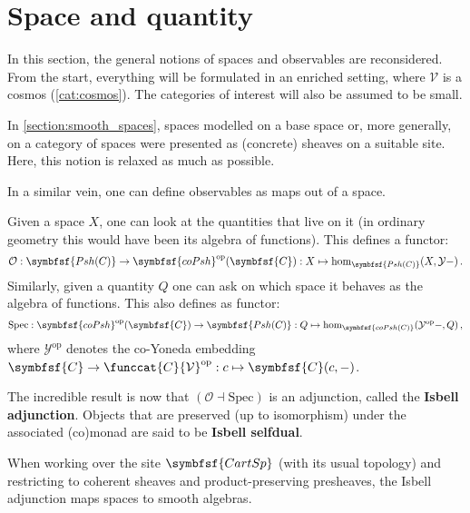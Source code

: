 
\section{Space and quantity}\label{section:space_and_quantity}

    In this section, the general notions of spaces and observables are reconsidered. From the start, everything will be formulated in an enriched setting, where $\mathcal{V}$ is a cosmos (\cref{cat:cosmos}). The categories of interest will also be assumed to be small.

    In \cref{section:smooth_spaces}, spaces modelled on a base space or, more generally, on a category of spaces were presented as (concrete) sheaves on a suitable site. Here, this notion is relaxed as much as possible.

    In a similar vein, one can define observables as maps out of a space.

    \begin{property}
        Given a space $X$, one can look at the quantities that live on it (in ordinary geometry this would have been its algebra of functions). This defines a functor:
        \begin{gather}
            \mathcal{O}:\symbfsf{Psh(C)}\rightarrow\symbfsf{coPsh}^{\text{op}}(\symbfsf{C}):X\mapsto\hom_{\symbfsf{Psh(C)}}(X,\mathcal{Y}-)\,.
        \end{gather}
        Similarly, given a quantity $Q$ one can ask on which space it behaves as the algebra of functions. This also defines as functor:
        \begin{gather}
            \mathrm{Spec}:\symbfsf{coPsh}^{\text{op}}(\symbfsf{C})\rightarrow\symbfsf{Psh(C)}:Q\mapsto\hom_{\symbfsf{coPsh(C)}}(\mathcal{Y}^{\text{op}}-,Q)\,,
        \end{gather}
        where $\mathcal{Y}^{\text{op}}$ denotes the co-Yoneda embedding $\symbfsf{C}\rightarrow\funccat{C}{\mathcal{V}}^{\text{op}}:c\mapsto\symbfsf{C}(c,-)$.

        The incredible result is now that $(\mathcal{O}\dashv\mathrm{Spec})$ is an adjunction, called the \textbf{Isbell adjunction}. Objects that are preserved (up to isomorphism) under the associated (co)monad are said to be \textbf{Isbell selfdual}.
    \end{property}

    \begin{example}
        When working over the site $\symbfsf{CartSp}$ (with its usual topology) and restricting to coherent sheaves and product-preserving presheaves, the Isbell adjunction maps spaces to smooth algebras.
    \end{example}